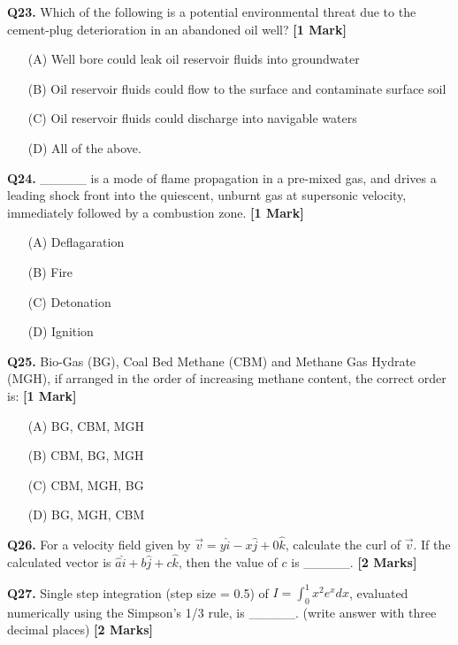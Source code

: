 \documentclass[11pt]{article}
\newcommand{\questiona}[2]{
    \noindent\textbf{Q#2.} #1 \hfill \textbf{[1 Mark]}
}
\newcommand{\questionb}[2]{
    \noindent\textbf{Q#2.} #1 \hfill \textbf{[2 Marks]}
}
\begin{document}
\questiona{Which of the following is a potential environmental threat due to the cement-plug deterioration in an abandoned oil well?}{23}
\begin{enumerate}
    \item[(A)] Well bore could leak oil reservoir fluids into groundwater  
    \item[(B)] Oil reservoir fluids could flow to the surface and contaminate surface soil  
    \item[(C)] Oil reservoir fluids could discharge into navigable waters  
    \item[(D)] All of the above.  
\end{enumerate}
\vspace{0.5cm}

\questiona{\_\_\_\_\_ is a mode of flame propagation in a pre-mixed gas, and drives a leading shock front into the quiescent, unburnt gas at supersonic velocity, immediately followed by a combustion zone.}{24}
\begin{enumerate}
    \item[(A)] Deflagaration  
    \item[(B)] Fire  
    \item[(C)] Detonation  
    \item[(D)] Ignition  
\end{enumerate}
\vspace{0.5cm}

\questiona{Bio-Gas (BG), Coal Bed Methane (CBM) and Methane Gas Hydrate (MGH), if arranged in the order of increasing methane content, the correct order is:}{25}
\begin{enumerate}
    \item[(A)] BG, CBM, MGH  
    \item[(B)] CBM, BG, MGH  
    \item[(C)] CBM, MGH, BG  
    \item[(D)] BG, MGH, CBM  
\end{enumerate}
\vspace{0.5cm}

\questionb{For a velocity field given by \( \vec{v} = y\hat{i} - x\hat{j} + 0\hat{k} \), calculate the curl of \( \vec{v} \). If the calculated vector is \( \hat{a}\hat{i} + b\hat{j} + c\hat{k} \), then the value of \( c \) is \_\_\_\_\_.}{26}
\vspace{0.5cm}

\questionb{Single step integration (step size = 0.5) of \( I = \int_{0}^{1} x^{2} e^{x} dx \), evaluated numerically using the Simpson's 1/3 rule, is \_\_\_\_\_. (write answer with three decimal places)}{27}
\vspace{0.5cm}
\end{document}
